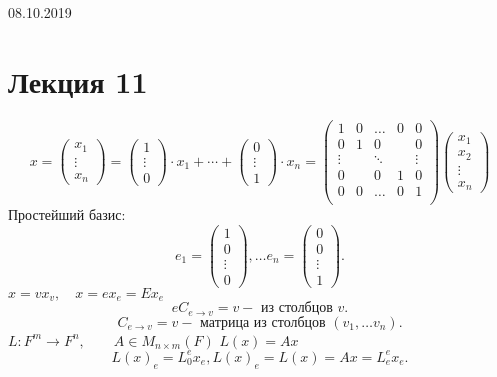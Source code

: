 \documentclass[12pt]{report}
\begin{document}
08.10.2019
\section{Лекция 11}
$$
x = 
 \left ( 
\begin{array}{c}
x_1 \\ \vdots \\x_n 
\end{array}
\right )
= \left ( 
\begin{array}{c}
1 \\ \vdots \\ 0
\end{array}
\right )\cdot x_1 + \cdots + \left ( 
\begin{array}{c}
0 \\ \vdots \\ 1
\end{array}
\right ) \cdot x_n = 
\left ( 
\begin{array}{ccccc}
    1 & 0  & \ldots & 0 & 0 \\
    0 & 1  & 0 & & 0\\
    \vdots & & \ddots & & \vdots \\
    0 &  & 0 & 1 & 0\\
    0 & 0  & \ldots & 0 & 1 \\
\end{array}
\right )
\left ( 
\begin{array}{c}
    x_1 \\ x_2 \\ \vdots \\ x_n
\end{array}
\right )
$$
Простейший базис:
\[
e_1 = 
\left ( 
\begin{array}{c}
1 \\ 0 \\ \vdots \\ 0
\end{array}
\right )
, \ldots e_n = \left ( 
\begin{array}{c}
0 \\ 0 \\ \vdots \\ 1
\end{array}
\right )
.\] 
$x = v x_v, \quad x = e x_e = E x_e$\\
 \[
     e C_{e \to v} = v - \mbox{ из столбцов } v
.\] 
\[
    C_{e \to v} = v - \mbox{ матрица из столбцов } (v_1, \ldots v_n)
.\] 
$L: F^m \to F^n , \qquad A \in M_{n \times m}(F)$
$L(x) = A x$\\
 \[
     L(x)_e = L_0^e x_e , L(x)_e = L(x) = Ax = L_e ^e x_e
.\] 
\end{document}
